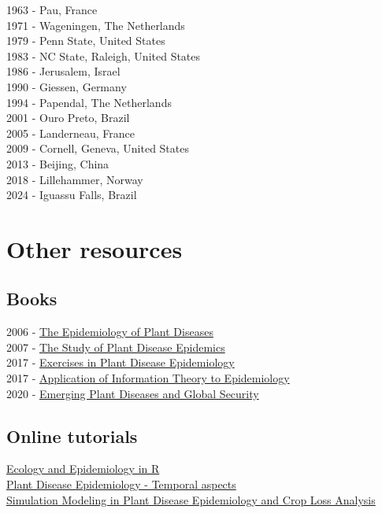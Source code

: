 \documentclass[
  letterpaper,
]{book}
\begin{document}
1963 - Pau, France\\
1971 - Wageningen, The Netherlands\\
1979 - Penn State, United States\\
1983 - NC State, Raleigh, United States\\
1986 - Jerusalem, Israel\\
1990 - Giessen, Germany\\
1994 - Papendal, The Netherlands\\
2001 - Ouro Preto, Brazil\\
2005 - Landerneau, France\\
2009 - Cornell, Geneva, United States\\
2013 - Beijing, China\\
2018 - Lillehammer, Norway\\
2024 - Iguassu Falls, Brazil

\hypertarget{other-resources}{%
\section{Other resources}\label{other-resources}}

\hypertarget{books}{%
\subsection{Books}\label{books}}

2006 - \href{https://link.springer.com/book/10.1007/1-4020-4581-6}{The
Epidemiology of Plant Diseases}\\
2007 -
\href{https://apsjournals.apsnet.org/doi/book/10.1094/9780890545058}{The
Study of Plant Disease Epidemics}\\
2017 -
\href{https://apsjournals.apsnet.org/doi/book/10.1094/9780890544426}{Exercises
in Plant Disease Epidemiology}\\
2017 -
\href{https://apsjournals.apsnet.org/doi/book/10.1094/9780890544877}{Application
of Information Theory to Epidemiology}\\
2020 -
\href{https://apsjournals.apsnet.org/doi/book/10.1094/9780890546383}{Emerging
Plant Diseases and Global Security}\\

\hypertarget{online-tutorials}{%
\subsection{Online tutorials}\label{online-tutorials}}

\href{https://www.apsnet.org/edcenter/disimpactmngmnt/topc/EcologyAndEpidemiologyInR/Pages/default.aspx}{Ecology
and Epidemiology in R}\\
\href{https://www.apsnet.org/edcenter/disimpactmngmnt/topc/EpidemiologyTemporal/Pages/default.aspx}{Plant
Disease Epidemiology - Temporal aspects}\\
\href{https://www.apsnet.org/edcenter/disimpactmngmnt/topc/BotanicalEpidemiology/Pages/default.aspx}{Simulation
Modeling in Plant Disease Epidemiology and Crop Loss Analysis}
\end{document}
